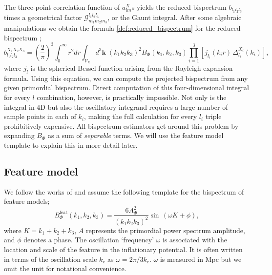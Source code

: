 The three-point correlation function of $a_{lm}^X$s yields the reduced bispectrum $b_{l_1 l_2 l_3}$ times a geometrical factor $\mathcal{G}^{l_1 l_2 l_3}_{m_1 m_2 m_3}$, or the Gaunt integral. After some algebraic manipulations we obtain the formula \eqref{def:reduced_bispectrum} for the reduced bispectrum ;
\begin{equation}
	b_{l_1 l_2 l_3}^{X_1 X_2 X_3} = \left(\frac{2}{\pi}\right)^3 \int_{0}^{\infty} r^2 dr \int_{\mathcal{V}_k} d^3\textbf{k} \; (k_1 k_2 k_3)^2 B_\Phi (k_1, k_2, k_3) \prod_{i=1}^{3} \left[ j_{l_i}(k_i r) \, \Delta_{l_i}^{X_i}(k_i) \right],
	\label{reduced bispectrum}
\end{equation}
where $j_l$ is the spherical Bessel function arising from the Rayleigh expansion formula. Using this equation, we can compute the projected bispectrum from any given primordial bispectrum. Direct computation of this four-dimensional integral for every $l$ combination, however, is practically impossible. Not only is the integral in 4D but also the oscillatory integrand requires a large number of sample points in each of $k_i$, making the full calculation for every $l_i$ triple prohibitively expensive. All bispectrum estimators get around this problem by expanding $B_\Phi$ as a sum of \textit{separable} terms. We will use the feature model template to explain this in more detail later.

\subsection{Feature model}

We follow the works of \cite{Munchmeyer2014,Fergusson2015a,Fergusson2015b,PlanckCollaboration2015} and assume the following template for the bispectrum of feature models;
\begin{equation}
	B_\Phi ^ {\text{feat}}(k_1, k_2, k_3) = \frac{6 A_\Phi^2}{(k_1 k_2 k_3)^2} \sin\,(\omega K + \phi),
	\label{feature model definition}
\end{equation}
where $K = k_1 + k_2 + k_3$, $A$ represents the primordial power spectrum amplitude, and $\phi$ denotes a phase. The oscillation `frequency' $\omega$ is associated with the location and scale of the feature in the inflationary potential. It is often written in terms of the oscillation scale $k_c$ as $\omega = 2\pi/3k_c$. $\omega$ is measured in Mpc but we omit the unit for notational convenience.

